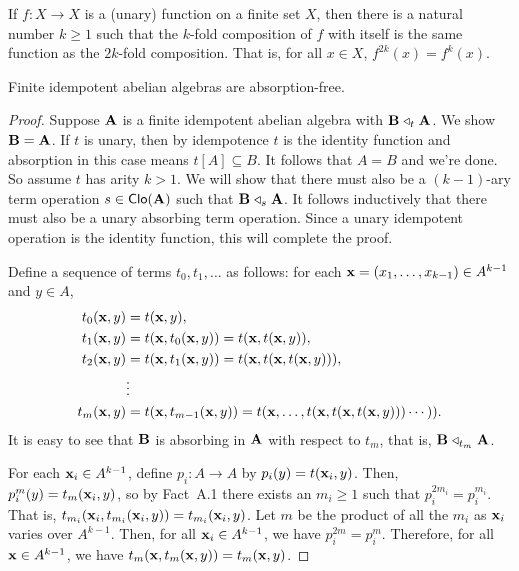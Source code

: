 \begin{fact}
\label{fact:idemp-funct-fin-set}
  If $f\colon X \rightarrow X$ is a (unary) function on a finite set $X$, then there
  is a natural number $k\geq 1$ 
  such that the $k$-fold composition of $f$ with itself
  is the same function as the $2k$-fold composition.  That is, for all 
  $x \in X$, $f^{2k}(x) = f^k(x)$.
\end{fact}

\begin{lem}
Finite idempotent abelian algebras are absorption-free.
\end{lem}
\begin{proof}
  Suppose $\mathbf{A}$ is a finite idempotent abelian algebra with $\mathbf{B} \mathrel{\triangleleft}_t \mathbf{A}$.
  We show $\mathbf{B} = \mathbf{A}$.
  If $t$ is unary, then by idempotence $t$ is the identity function and
  absorption in this case means $t[A] \subseteq B$.  It follows that $A = B$ and
  we're done.  So assume $t$ has arity $k>1$.  We
  will show that there must also be a $(k-1)$-ary term operation 
  $s\in \operatorname{\mathsf{Clo}}(\mathbf{A})$ such that $\mathbf{B} \mathrel{\triangleleft}_s \mathbf{A}$.  
  It follows inductively that there must also be a unary absorbing term
  operation. Since a unary idempotent operation is the identity
  function, this will complete the proof.

  Define a sequence of terms $t_0, t_1, \dots$ as follows:
  for each $\mathbf{x} = (x_1, \dots, x_{k-1}) \in A^{k-1}$ and $y\in A$,
  \begin{align*}
    t_0(\mathbf{x}, y) &= t(\mathbf{x}, y),\\
    t_1(\mathbf{x}, y) &= t(\mathbf{x}, t_0(\mathbf{x}, y)) = t(\mathbf{x}, t(\mathbf{x}, y)), \\
    t_2(\mathbf{x}, y) &= t(\mathbf{x}, t_1(\mathbf{x}, y)) = t(\mathbf{x}, t(\mathbf{x}, t(\mathbf{x}, y))),\\
     &\vdots\\
    t_m(\mathbf{x}, y) &= t(\mathbf{x}, t_{m-1}(\mathbf{x}, y)) 
                 = t(\mathbf{x}, \dots, t(\mathbf{x}, t(\mathbf{x}, t(\mathbf{x}, y))) \cdots )).
  \end{align*}
  It is easy to see that $\mathbf{B}$ is absorbing in $\mathbf{A}$ with respect to $t_m$, that
  is, $\mathbf{B} \mathrel{\triangleleft}_{t_m} \mathbf{A}$.  

  For each $\mathbf{x}_i\in A^{k-1}$, 
  define $p_i:A \rightarrow A$ by $p_i(y) = t(\mathbf{x}_i, y)$.  Then, 
  $p_i^m(y) = t_m(\mathbf{x}_i, y)$, so by
  Fact~A.1 %
  there exists an $m_i\geq 1$ such that 
   $p_i^{2m_i} = p_i^{m_i}$.  That is, 
  $t_{m_i}(\mathbf{x}_i,t_{m_i}(\mathbf{x}_i,y)) = t_{m_i}(\mathbf{x}_i,y)$.
  Let $m$ be the product of all the $m_i$ as $\mathbf{x}_i$ varies over $A^{k-1}$.
  Then, for all $\mathbf{x}_i \in A^{k-1}$, we have 
   $p_i^{2m} = p_i^{m}$.  Therefore, 
  for all $\mathbf{x} \in A^{k-1}$, we have 
  $t_{m}(\mathbf{x},t_{m}(\mathbf{x},y)) = t_{m}(\mathbf{x},y)$.


\end{proof}
